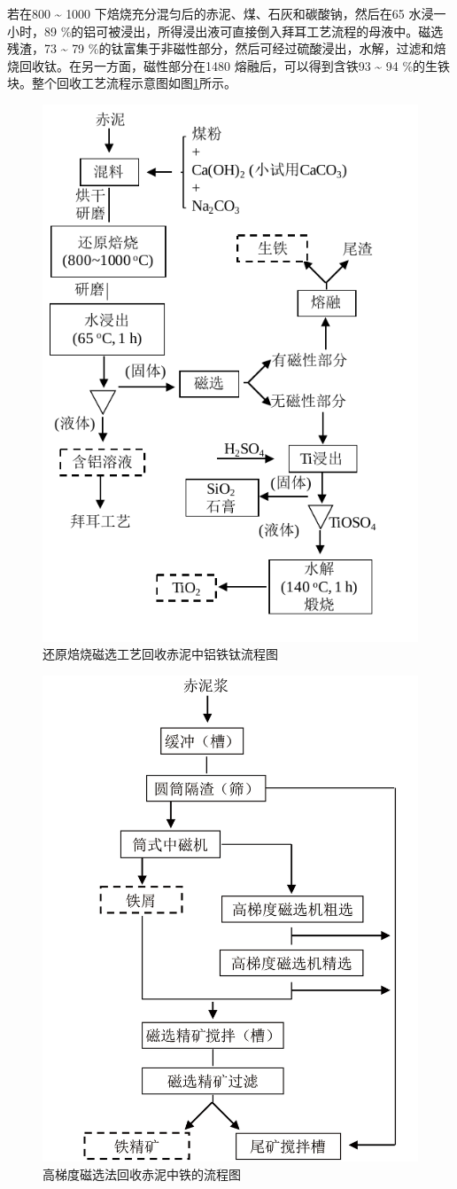 若在800 \textasciitilde{ }1000 \textcelsius 下焙烧充分混匀后的赤泥、煤、石灰和碳酸钠，然后在65 \textcelsius 水浸一小时，89 \%的铝可被浸出，所得浸出液可直接倒入拜耳工艺流程的母液中。磁选残渣，73 \textasciitilde{ }79 \%的钛富集于非磁性部分，然后可经过硫酸浸出，水解，过滤和焙烧回收钛。在另一方面，磁性部分在1480 \textcelsius 熔融后，可以得到含铁93 \textasciitilde{ }94 \%的生铁块。整个回收工艺流程示意图如图\ref{reducing&magneticseparation}所示\cite{piga1993recovering}。
\begin{figure}[!h]
	\centering
	
	\includegraphics[width=0.65\linewidth]{Figures/c1/Figure4}
	\caption{还原焙烧磁选工艺回收赤泥中铝铁钛流程图}\label{reducing&magneticseparation}
\end{figure}

\begin{figure}[!h]
	\centering
	
	\includegraphics[width=0.65\linewidth]{Figures/c1/Figure5}
	\caption{高梯度磁选法回收赤泥中铁的流程图}\label{highgrademagneticseparation}
\end{figure}

